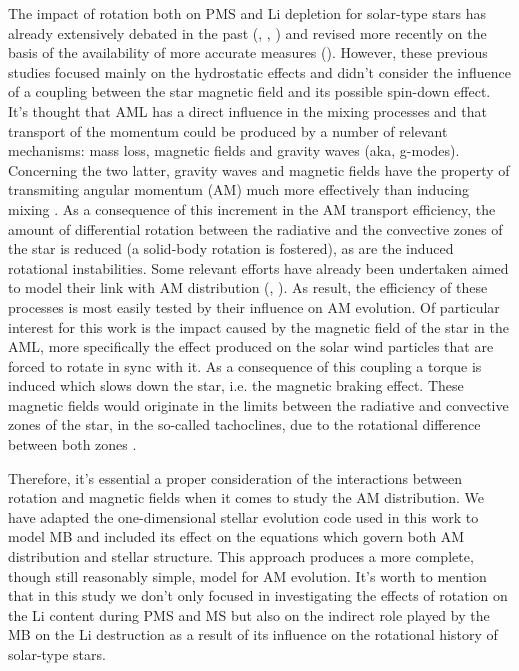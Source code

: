 \documentclass[fleqn,usenatbib]{mnras}
\begin{document}
The impact of rotation both on PMS and Li depletion for solar-type stars has already extensively debated in the past (\citet{Pinsonneault1997}, \citet{Jeffries2004}, \citet{Somers2014}) and revised more recently on the basis of the availability of more accurate measures (\citet{Bouvier2016}). However, these previous studies focused mainly on the hydrostatic effects and didn't consider the influence of a coupling between the star magnetic field and its possible spin-down effect. It's thought that AML has a direct influence in the mixing processes and that transport of the momentum could be produced by a number of relevant mechanisms: mass loss, magnetic fields and gravity waves (aka, g-modes). Concerning the two latter, gravity waves \citep{Charbonnel2005} and magnetic fields \citep{Eggenberger2009} have the property of transmiting angular momentum (AM) much more effectively than inducing mixing \citep{Denissenkov2007}. As a consequence of this increment in the AM transport efficiency, the amount of differential rotation between the radiative and the convective zones of the star is reduced (a solid-body rotation is fostered), as are the induced rotational instabilities. Some relevant efforts have already been undertaken aimed to model their link with AM distribution (\citet{Eggenberger2008}, \citet{Fuller2014}). As result, the efficiency of these processes is most easily tested by their influence on AM evolution. Of particular interest for this work is the impact caused by the magnetic field of the star in the AML, more specifically the effect produced on the solar wind particles that are forced to rotate in sync with it. As a consequence of this coupling a torque is induced which slows down the star, i.e. the magnetic braking effect. These magnetic fields would originate in the limits between the radiative and convective zones of the star, in the so-called tachoclines, due to the rotational difference between both zones \citep{Guerrero2016}. \par

Therefore, it's essential a proper consideration of the interactions between rotation and magnetic fields when it comes to study the AM distribution. We have adapted the one-dimensional stellar evolution code used in this work to model MB and included its effect on the equations which govern both AM distribution and stellar structure. This approach produces a more complete, though still reasonably simple, model for AM evolution. It's worth to mention that in this study we don't only focused in investigating the effects of rotation on the Li content during PMS and MS but also on the indirect role played by the MB on the Li destruction as a result of its influence on the rotational history of solar-type stars.\par
\end{document}

